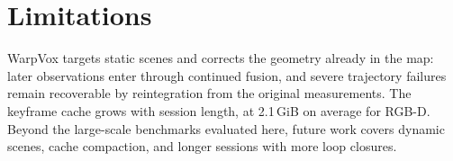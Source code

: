 \section{Limitations}
\label{sec:limitations}
WarpVox targets static scenes and corrects the geometry already in the map:
later observations enter through continued fusion, and severe trajectory
failures remain recoverable by reintegration from the original measurements.
The keyframe cache grows with session length, at 2.1\,GiB on average for
RGB-D. Beyond the large-scale benchmarks evaluated
here, future work covers dynamic scenes, cache compaction, and longer
sessions with more loop closures.
